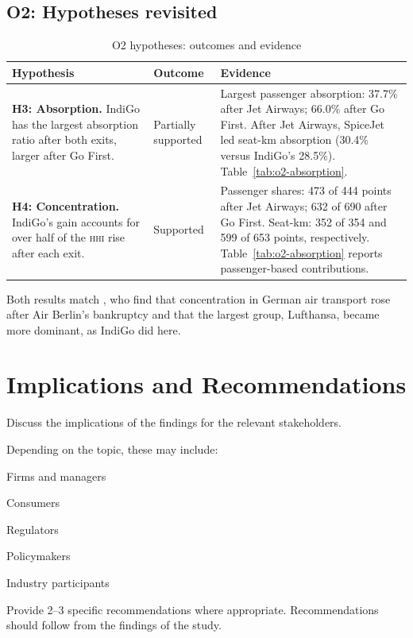 \documentclass[12pt,a4paper]{article}
\newcommand{\HHI}{\textnormal{\textsc{hhi}}}
\newenvironment{mycontribution}{\par\color{blue}\captionsetup{font+={color=blue}}}{\par}
\newcommand{\templatebullet}[1]{\par\noindent\textbullet\hspace{5.88pt}#1\par}
\begin{document}
\begin{mycontribution}
\subsection{O2: Hypotheses revisited}
\begin{table}[H]
\centering
\color{blue}
\caption{O2 hypotheses: outcomes and evidence}\label{tab:hypotheses}
\small
\begin{tabular}{@{}>{\raggedright\arraybackslash}p{}>{\raggedright\arraybackslash}p{}>{\raggedright\arraybackslash}p{}@{}}
\toprule
\textbf{Hypothesis} & \textbf{Outcome} & \textbf{Evidence} \\
\midrule
\textbf{H3: Absorption.} IndiGo has the largest absorption ratio after both exits, larger after Go First. & Partially supported & Largest passenger absorption: 37.7\% after Jet Airways; 66.0\% after Go First. After Jet Airways, SpiceJet led seat-km absorption (30.4\% versus IndiGo's 28.5\%). Table~\ref{tab:o2-absorption}. \\
\addlinespace
\textbf{H4: Concentration.} IndiGo's gain accounts for over half of the \HHI{} rise after each exit. & Supported & Passenger shares: 473 of 444 points after Jet Airways; 632 of 690 after Go First. Seat-km: 352 of 354 and 599 of 653 points, respectively. Table~\ref{tab:o2-absorption} reports passenger-based contributions. \\
\bottomrule
\end{tabular}
\end{table}
Both results match \textcite{grosche2020concentration}, who find that concentration in German air transport rose after Air Berlin's bankruptcy and that the largest group, Lufthansa, became more dominant, as IndiGo did here.
\end{mycontribution}

\section{Implications and Recommendations}
Discuss the implications of the findings for the relevant stakeholders.

Depending on the topic, these may include:
\templatebullet{Firms and managers}
\templatebullet{Consumers}
\templatebullet{Regulators}
\templatebullet{Policymakers}
\templatebullet{Industry participants}
Provide 2--3 specific recommendations where appropriate. Recommendations should follow from the findings of the study.
\end{document}
